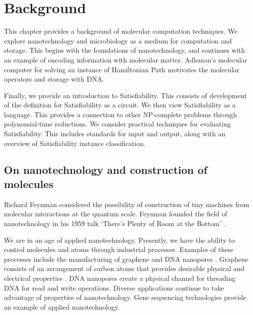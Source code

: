 \chapter{Background}


This chapter provides a background of molecular computation techniques.  We explore nanotechnology and microbiology as a medium for computation and storage.  This begins with the foundations of nanotechnology, and continues with an example of encoding information with molecular matter.  Adleman's molecular computer for solving an instance of {\sc Hamiltonian Path} motivates the molecular operators and storage with DNA.

Finally, we provide an introduction to {\sc Satisfiability}.  This consists of development of the definition for {\sc Satisfiability} as a circuit.  We then view {\sc Satisfiability} as a language.  This provides a connection to other \textsf{NP-complete} problems through polynomial-time reductions.  We consider practical techniques for evaluating {\sc Satisfiability}.  This includes standards for input and output, along with an overview of {\sc Satisfiability} instance classification. 

\section{On nanotechnology and construction of molecules}

		
			Richard Feynman considered the possibility of construction of tiny machines from molecular interactions at the quantum scale.  Feynman founded the field of nanotechnology in his 1959 talk `There's Plenty of Room at the Bottom' \cite{feynman1959}.
			
We are in an age of applied nanotechnology. Presently, we have the ability to control molecules and atoms through industrial processes. Examples of these processes include the manufacturing of graphene and DNA nanopores \cite{dnaTransistorIBMpressrelease}. Graphene consists of an arrangement of carbon atoms that provides desirable physical and electrical properties \cite{Stankovich_Dikin_Dommett_Kohlhaas_Zimney_Stach_Piner_Nguyen_Ruoff_2006}. DNA nanopores create a physical channel for threading DNA for read and write operations.  Diverse applications continue to take advantage of properties of nanotechnology.  Gene sequencing technologies provide an example of applied nanotechnology.  					
		
